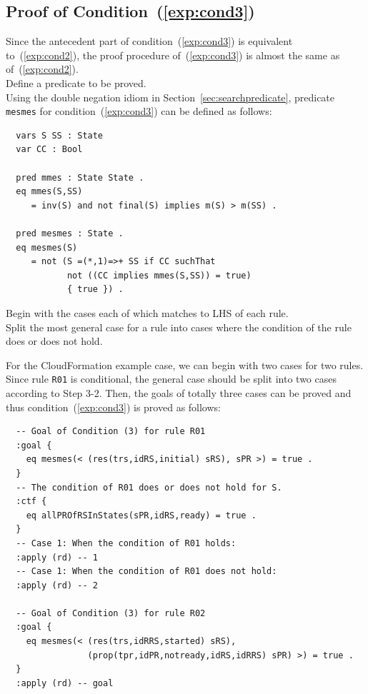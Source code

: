 \documentclass[12pt]{report}
\begin{document}
\subsection{Proof of Condition~(\ref{exp:cond3})}
\label{sec:TOSCAmesmes}
Since the antecedent part of condition~(\ref{exp:cond3}) is equivalent
to~(\ref{exp:cond2}), the proof procedure of~(\ref{exp:cond3}) is
almost the same as of~(\ref{exp:cond2}). \\

 Define a predicate to be proved.\\ Using the
double negation idiom in Section~\ref{sec:searchpredicate}, predicate
{\tt mesmes} for condition~(\ref{exp:cond3}) can be defined as follows:
\small
\begin{verbatim}
  vars S SS : State
  var CC : Bool

  pred mmes : State State .
  eq mmes(S,SS)
     = inv(S) and not final(S) implies m(S) > m(SS) .

  pred mesmes : State .
  eq mesmes(S)
     = not (S =(*,1)=>+ SS if CC suchThat
            not ((CC implies mmes(S,SS)) = true)
            { true }) .
\end{verbatim}
\normalsize

\vspace{0.3cm}
 Begin with the cases each of which matches to
LHS of each rule. \\ 
 Split the most general case for a rule into
cases where the condition of the rule does or does not hold. 

For the CloudFormation example case, we can begin with two cases for
two rules. Since rule {\tt R01} is conditional, the general case
should be split into two cases according to Step 3-2. Then, the goals
of totally three cases can be proved and thus
condition~(\ref{exp:cond3}) is proved as follows:
\small
\begin{verbatim}
  -- Goal of Condition (3) for rule R01
  :goal {
    eq mesmes(< (res(trs,idRS,initial) sRS), sPR >) = true .
  }
  -- The condition of R01 does or does not hold for S.
  :ctf {
    eq allPROfRSInStates(sPR,idRS,ready) = true .
  }
  -- Case 1: When the condition of R01 holds:
  :apply (rd) -- 1
  -- Case 1: When the condition of R01 does not hold:
  :apply (rd) -- 2

  -- Goal of Condition (3) for rule R02
  :goal {
    eq mesmes(< (res(trs,idRRS,started) sRS),
                (prop(tpr,idPR,notready,idRS,idRRS) sPR) >) = true .
  }
  :apply (rd) -- goal

\end{verbatim}
\normalsize
\end{document}
